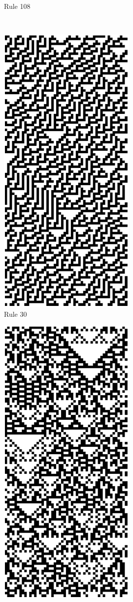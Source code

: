 \begin{figure}
\begin{subfigure}[b]{0.25\textwidth}
   \caption[]{Rule 108}%
   \end{subfigure}%
   \\
   	\begin{subfigure}[b]{0.25\textwidth}
   		\centering
   		\label{fig:first}
   		
   		\includegraphics[scale=0.32]{./images/CA_FDM/rule30}
   		\caption[]{Rule 30}%
   	\end{subfigure}%
   	\begin{subfigure}[b]{0.275\textwidth}
   		\centering
   		\includegraphics[scale=0.32]{./images/CA_FDM/rule90}

\end{subfigure}
\end{figure}

